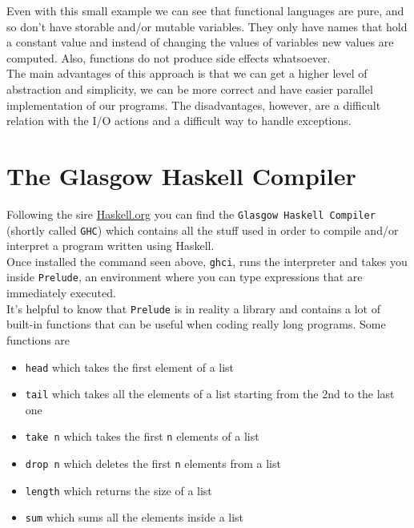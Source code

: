 Even with this small example we can see that functional languages are pure, and so don't have storable and/or mutable variables. They only have names that hold a constant value and instead of changing the values of variables new values are computed. Also, functions do not produce side effects whatsoever. \\
The main advantages of this approach is that we can get a higher level of abstraction and simplicity, we can be more correct and have easier parallel implementation of our programs. The disadvantages, however, are a difficult relation with the I/O actions and a difficult way to handle exceptions. 

\section{The Glasgow Haskell Compiler}
Following the sire \href{https://haskell.org}{Haskell.org} you can find the \texttt{Glasgow Haskell Compiler} (shortly called \texttt{GHC}) which contains all the stuff used in order to compile and/or interpret a program written using Haskell. \\
Once installed the command seen above, \texttt{ghci}, runs the interpreter and takes you inside \texttt{Prelude}, an environment where you can type expressions that are immediately executed. \\
It's helpful to know that \texttt{Prelude} is in reality a library and contains a lot of built-in functions that can be useful when coding really long programs. Some functions are

\begin{itemize}
	\item \texttt{head} which takes the first element of a list
	\item \texttt{tail} which takes all the elements of a list starting from the 2nd to the last one
	\item \texttt{take n} which takes the first \texttt{n} elements of a list
	\item \texttt{drop n} which deletes the first \texttt{n} elements from a list
	\item \texttt{length} which returns the size of a list
	\item \texttt{sum} which sums all the elements inside a list
\end{itemize}
